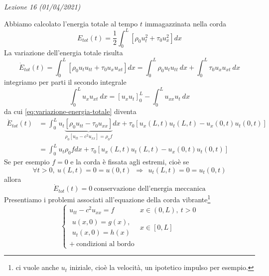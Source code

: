 \documentclass[10pt,a4paper,twoside,openright]{book}
\begin{document}
\textit{Lezione 16 (01/04/2021)}

Abbiamo calcolato l'energia totale al tempo $t$ immagazzinata nella corda
\begin{equation*}
	E_{tot}( t) =\frac{1}{2}\int ^{L}_{0}\left[ \rho _{0} u^{2}_{t} +\tau _{0} u^{2}_{x}\right] dx
\end{equation*}
La variazione dell'energia totale risulta
\begin{equation}
	\dot{E}_{tot}( t) =\int ^{L}_{0}[ \rho _{0} u_{t} u_{tt} +\tau _{0} u_{x} u_{xt}] dx=\int ^{L}_{0} \rho _{0} u_{t} u_{tt} \ dx+\int ^{L}_{0} \tau _{0} u_{x} u_{xt} \ dx
	\label{eq:variazione-energia-totale}
\end{equation}
integriamo per parti il secondo integrale
\begin{equation*}
	\int ^{L}_{0} u_{x} u_{xt} \ dx=[ u_{x} u_{t}]^{L}_{0} -\int ^{L}_{0} u_{xx} u_{t} \ dx
\end{equation*}
da cui \eqref{eq:variazione-energia-totale} diventa
\begin{align*}
	\dot{E}_{tot}( t) & =\int ^{L}_{0} u_{t}\underbrace{[ \rho _{0} u_{tt} -\tau _{0} u_{xx}]}_{\rho _{0}\left[ u_{tt} -c^{2} u_{xx}\right] =\rho _{0} f} dx+\tau _{0}[ u_{x}( L,t) u_{t}( L,t) -u_{x}( 0,t) u_{t}( 0,t)] \\
	                  & =\int ^{L}_{0} u_{t} \rho _{0} fdx+\tau _{0}[ u_{x}( L,t) u_{t}( L,t) -u_{x}( 0,t) u_{t}( 0,t)]                                                                                                   
\end{align*}
Se per esempio $f=0$ e la corda è fissata agli estremi, cioè se
\begin{equation*}
	\forall t >0,\ u( L,t) =0=u( 0,t) \ \ \Rightarrow \ \ u_{t}( L,t) =0=u_{t}( 0,t)
\end{equation*}
allora
\begin{equation*}
	\dot{E}_{tot}( t) =0\ \text{conservazione dell'energia meccanica}
\end{equation*}
Presentiamo i problemi associati all'equazione della corda vibrante\footnote{ci vuole anche $u_{t}$ iniziale, cioè la velocità, un ipotetico impulso per esempio.}
\begin{equation*}
	\begin{cases}
		u_{tt} -c^{2} u_{xx} =f       & x\in ( 0,L) ,\ t >0 \\
		\begin{array}{l}
		u( x,0) =g( x) ,\\
		u_{t}( x,0) =h( x)
		\end{array}                   & x\in [ 0,L]         \\
		+\ \text{condizioni al bordo} &                     
	\end{cases}
\end{equation*}
\end{document}
